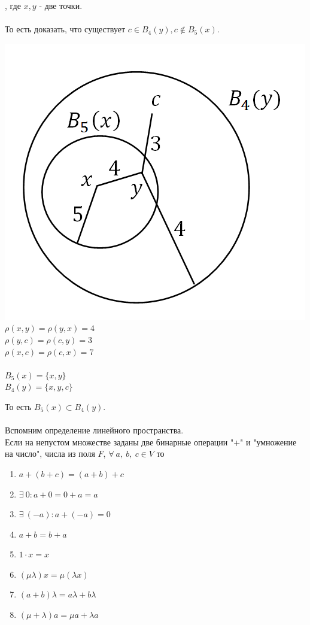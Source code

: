 \documentclass[12pt]{article}
\theoremstyle{definition}
\numberwithin{equation}{section}
\begin{document}
, где $x, y$ - две точки. \\ \\То есть доказать, что существует $c\in B_4(y), c\notin B_5(x)$.\begin{center}
\includegraphics[scale=0.5]{l4_5.png}\\
$\rho (x, y) = \rho(y, x) = 4$\\
$\rho (y, c) = \rho(c, y) = 3$\\
$\rho (x, c) = \rho(c, x) = 7$\\
~\\
$B_5(x) = \{ x, y \}$\\
$B_4(y) = \{x, y, c \} $\end{center}
То есть $B_5(x) \subset B_4(y)$.\\
\\
Вспомним определение линейного пространства.\\
Если на непустом множестве заданы две бинарные операции "+" и "умножение на число", числа из поля $F$, $\forall ~a,~b,~c\in V$ то\begin{enumerate}
\item $a+(b+c) = (a+b)+c$
\item $\exists~0: a+0 = 0+a = a$
\item $\exists~ (-a): a+(-a) = 0$
\item $a+b = b+a$
\item $1\cdot x = x$
\item $ (\mu \lambda)x = \mu(\lambda x)$
\item $(a+b)\lambda = a\lambda + b\lambda$
\item $(\mu + \lambda)a = \mu a + \lambda a$
\end{enumerate}
\end{document}
